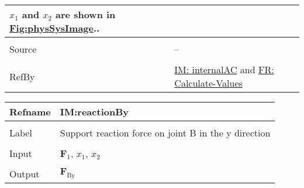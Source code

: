 \documentclass[12pt]{article}
\begin{document}
\begin{minipage}{\textwidth}
\begin{tabular}{>{\raggedright}p{}>{\raggedright\arraybackslash}p{}}
        ${x_{\text{1}}}$ and ${x_{\text{2}}}$ are shown in \hyperref[Figure:physSysImage]{Fig:physSysImage}..
        
\\ \midrule \\
Source & --
         
\\ \midrule \\
RefBy & \hyperref[IM:internalAC]{IM: internalAC} and \hyperref[calcValues]{FR: Calculate-Values}
        
\\ \bottomrule
\end{tabular}
\end{minipage}

\vspace{\baselineskip}
\noindent
\begin{minipage}{\textwidth}
\begin{tabular}{>{\raggedright}p{}>{\raggedright\arraybackslash}p{}}
\toprule \textbf{Refname} & \textbf{IM:reactionBy}
\label{IM:reactionBy}
\\ \midrule \\
Label & Support reaction force on joint B in the y direction
        
\\ \midrule \\
Input & ${\mathbf{F}_{1}}$, ${x_{\text{1}}}$, ${x_{\text{2}}}$
        
\\ \midrule \\
Output & ${\mathbf{F}_{\text{By}}}$
         

\end{tabular}
\end{minipage}
\end{document}
